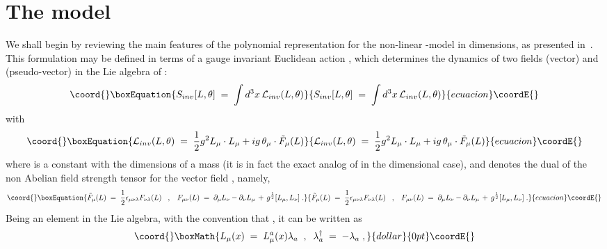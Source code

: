 \documentclass[a4paper,12pt]{article}
\begin{document}
\section{The model}\label{sec:themodel}
We shall begin by reviewing the main features of the polynomial
representation for the \coordHE{} non-linear \myHighlight{$\sigma$}\coordHE{}-model in \coordHE{}
dimensions, as presented in~\cite{fm1,fm2}.  This formulation may be
defined in terms of a gauge invariant Euclidean action \coordHE{},
which determines the dynamics of two fields \coordHE{} (vector) and
\myHighlight{$\theta_\mu$}\coordHE{} (pseudo-vector) in the Lie algebra of \coordHE{}:
\begin{equation}\coord{}\boxEquation{\label{eq:defseuc}
S_{inv}[L,\theta] \;=\; \int d^3x \,{\mathcal L}_{inv} (L,\theta)
}{S_{inv}[L,\theta] \;=\; \int d^3x \,{\mathcal L}_{inv} (L,\theta)
}{ecuacion}\coordE{}\end{equation}
with
\begin{equation}\coord{}\boxEquation{\label{eq:defleuc}
{\mathcal L}_{inv}(L,\theta)\;=\; \frac{1}{2} g^2 L_{\mu}\cdot L_\mu
+ i g \,\theta_\mu \cdot {\tilde F}_\mu(L)
}{{\mathcal L}_{inv}(L,\theta)\;=\; \frac{1}{2} g^2 L_{\mu}\cdot L_\mu
+ i g \,\theta_\mu \cdot {\tilde F}_\mu(L)
}{ecuacion}\coordE{}\end{equation}
where \coordHE{} is a constant with the dimensions of a mass (it is in fact
the exact analog of \coordHE{} in the \coordHE{} dimensional case), and
\coordHE{} denotes the dual of the non Abelian field
strength tensor for the vector field \coordHE{}, namely,
\begin{equation}\coord{}\boxEquation{\label{eq:defFt}
{\tilde F}_\mu (L) \;=\; \frac{1}{2}\epsilon_{\mu\nu\lambda} F_{\nu\lambda}(L)
\;\;\;,\;\;\;
F_{\mu\nu}(L) \;=\; \partial_\mu L_\nu - \partial_\nu L_\mu
\,+\, g^{\frac{1}{2}} [L_\mu , L_\nu ] \;.
}{{\tilde F}_\mu (L) \;=\; \frac{1}{2}\epsilon_{\mu\nu\lambda} F_{\nu\lambda}(L)
\;\;\;,\;\;\;
F_{\mu\nu}(L) \;=\; \partial_\mu L_\nu - \partial_\nu L_\mu
\,+\, g^{\frac{1}{2}} [L_\mu , L_\nu ] \;.
}{ecuacion}\coordE{}\end{equation}
Being \coordHE{} an element in the Lie algebra, with the convention that
\coordHE{}, it can be written as
$$\coord{}\boxMath{
L_\mu(x) \;=\; L_\mu^a (x) \lambda_a \;\;,\;\; \lambda_a^\dagger
\;=\; - \lambda_a \;,
}{dollar}{0pt}\coordE{}$$
\end{document}
